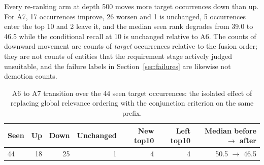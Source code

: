\documentclass[11pt,a4paper]{article}
\begin{document}
\begin{table}[htbp]
\centering
\footnotesize
\caption{Movement of target occurrences seen inside each re-ranking pool, relative to the A5 fusion order. Medians are over the seen occurrences. Conditional recall at 10 is over the seen occurrences of that pool.}
\label{tab:movement}
\end{table}

Every re-ranking arm at depth 500 moves more target occurrences down than up. For A7, 17 occurrences improve, 26 worsen and 1 is unchanged, 5 occurrences enter the top 10 and 2 leave it, and the median seen rank degrades from 39.0 to 46.5 while the conditional recall at 10 is unchanged relative to A6. The counts of downward movement are counts of \emph{target} occurrences relative to the fusion order; they are not counts of entities that the requirement stage actively judged unsuitable, and the failure labels in Section~\ref{sec:failures} are likewise not demotion counts.

\begin{table}[htbp]
\centering
\footnotesize
\caption{A6 to A7 transition over the 44 seen target occurrences: the isolated effect of replacing global relevance ordering with the conjunction criterion on the same prefix.}
\label{tab:a6a7}
\begin{tabular}{@{}lrrrrrr@{}}
\toprule
Seen & Up & Down & Unchanged & New top10 & Left top10 & Median before $\to$ after \\
\midrule
44 & 18 & 25 & 1 & 4 & 4 & 50.5 $\to$ 46.5 \\
\bottomrule
\end{tabular}
\end{table}
\end{document}
